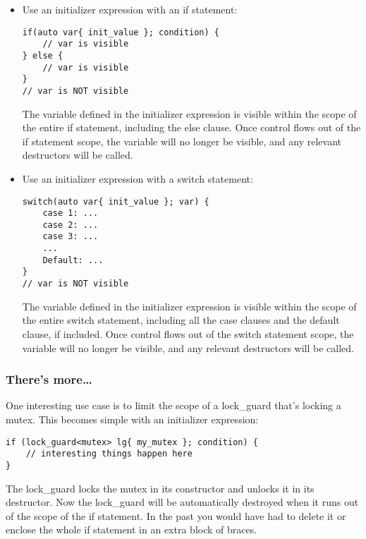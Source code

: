 \begin{itemize}
\item 
Use an initializer expression with an if statement:

\begin{lstlisting}[style=styleCXX]
if(auto var{ init_value }; condition) {
	// var is visible
} else {
	// var is visible
}
// var is NOT visible
\end{lstlisting}

The variable defined in the initializer expression is visible within the scope of the entire if statement, including the else clause. Once control flows out of the if statement scope, the variable will no longer be visible, and any relevant destructors will be called.

\item 
Use an initializer expression with a switch statement:

\begin{lstlisting}[style=styleCXX]
switch(auto var{ init_value }; var) {
	case 1: ...
	case 2: ...
	case 3: ...
	...
	Default: ...
}
// var is NOT visible
\end{lstlisting}

The variable defined in the initializer expression is visible within the scope of the entire switch statement, including all the case clauses and the default clause, if included. Once control flows out of the switch statement scope, the variable will no longer be visible, and any relevant destructors will be called.

\end{itemize}

\subsubsection{There's more…}

One interesting use case is to limit the scope of a lock\_guard that's locking a mutex. This becomes simple with an initializer expression:

\begin{lstlisting}[style=styleCXX]
if (lock_guard<mutex> lg{ my_mutex }; condition) {
	// interesting things happen here
}
\end{lstlisting}

The lock\_guard locks the mutex in its constructor and unlocks it in its destructor. Now the lock\_guard will be automatically destroyed when it runs out of the scope of the if statement. In the past you would have had to delete it or enclose the whole if statement in an extra block of braces.

